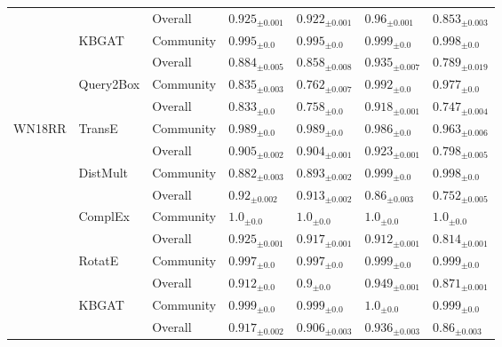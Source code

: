 \begin{table}[ht!]
\begin{adjustbox}{width=\textwidth}
\begin{tabular}{lllllll}
         &           & Overall &  ${{0.925}_{\pm 0.001}}$ &  ${{0.922}_{\pm 0.001}}$ &   ${{0.96}_{\pm 0.001}}$ &  ${{0.853}_{\pm 0.003}}$ \\
         & KBGAT & Community &    ${{0.995}_{\pm 0.0}}$ &    ${{0.995}_{\pm 0.0}}$ &    ${{0.999}_{\pm 0.0}}$ &    ${{0.998}_{\pm 0.0}}$ \\
         &           & Overall &  ${{0.884}_{\pm 0.005}}$ &  ${{0.858}_{\pm 0.008}}$ &  ${{0.935}_{\pm 0.007}}$ &  ${{0.789}_{\pm 0.019}}$ \\
         & Query2Box & Community &  ${{0.835}_{\pm 0.003}}$ &  ${{0.762}_{\pm 0.007}}$ &    ${{0.992}_{\pm 0.0}}$ &    ${{0.977}_{\pm 0.0}}$ \\
         &           & Overall &    ${{0.833}_{\pm 0.0}}$ &    ${{0.758}_{\pm 0.0}}$ &  ${{0.918}_{\pm 0.001}}$ &  ${{0.747}_{\pm 0.004}}$ \\
\midrule
WN18RR & TransE & Community &    ${{0.989}_{\pm 0.0}}$ &    ${{0.989}_{\pm 0.0}}$ &    ${{0.986}_{\pm 0.0}}$ &  ${{0.963}_{\pm 0.006}}$ \\
         &           & Overall &  ${{0.905}_{\pm 0.002}}$ &  ${{0.904}_{\pm 0.001}}$ &  ${{0.923}_{\pm 0.001}}$ &  ${{0.798}_{\pm 0.005}}$ \\
         & DistMult & Community &  ${{0.882}_{\pm 0.003}}$ &  ${{0.893}_{\pm 0.002}}$ &    ${{0.999}_{\pm 0.0}}$ &    ${{0.998}_{\pm 0.0}}$ \\
         &           & Overall &   ${{0.92}_{\pm 0.002}}$ &  ${{0.913}_{\pm 0.002}}$ &   ${{0.86}_{\pm 0.003}}$ &  ${{0.752}_{\pm 0.005}}$ \\
         & ComplEx & Community &      ${{1.0}_{\pm 0.0}}$ &      ${{1.0}_{\pm 0.0}}$ &      ${{1.0}_{\pm 0.0}}$ &      ${{1.0}_{\pm 0.0}}$ \\
         &           & Overall &  ${{0.925}_{\pm 0.001}}$ &  ${{0.917}_{\pm 0.001}}$ &  ${{0.912}_{\pm 0.001}}$ &  ${{0.814}_{\pm 0.001}}$ \\
         & RotatE & Community &    ${{0.997}_{\pm 0.0}}$ &    ${{0.997}_{\pm 0.0}}$ &    ${{0.999}_{\pm 0.0}}$ &    ${{0.999}_{\pm 0.0}}$ \\
         &           & Overall &    ${{0.912}_{\pm 0.0}}$ &      ${{0.9}_{\pm 0.0}}$ &  ${{0.949}_{\pm 0.001}}$ &  ${{0.871}_{\pm 0.001}}$ \\
         & KBGAT & Community &    ${{0.999}_{\pm 0.0}}$ &    ${{0.999}_{\pm 0.0}}$ &      ${{1.0}_{\pm 0.0}}$ &    ${{0.999}_{\pm 0.0}}$ \\
         &           & Overall &  ${{0.917}_{\pm 0.002}}$ &  ${{0.906}_{\pm 0.003}}$ &  ${{0.936}_{\pm 0.003}}$ &   ${{0.86}_{\pm 0.003}}$ \\

\end{tabular}
\end{adjustbox}
\end{table}
